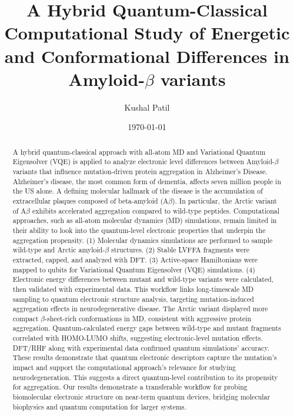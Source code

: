 \documentclass[%
 reprint,
 amsmath,amssymb,
 aps,
]{revtex4-2}
\begin{document}
\title{A Hybrid Quantum-Classical Computational
Study of Energetic and Conformational Differences in Amyloid-$\beta$ variants}

\author{Kushal Patil}

\date{\today}%

\begin{abstract}
A hybrid quantum-classical approach with all-atom MD and Variational Quantum Eigensolver (VQE) is applied to analyze electronic level differences between Amyloid-$\beta$ variants that influence mutation-driven protein aggregation in Alzheimer's Disease. Alzheimer’s disease, the most common form of dementia, affects seven million people in the US alone. A defining molecular hallmark of the disease is the accumulation of extracellular plaques composed of beta-amyloid (A$\beta$). In particular, the Arctic variant of A$\beta$ exhibits accelerated aggregation compared to wild-type peptides. Computational approaches, such as all-atom molecular dynamics (MD) simulations, remain limited in their ability to look into the quantum-level electronic properties that underpin the aggregation propensity. (1) Molecular dynamics simulations are performed to sample wild-type and Arctic amyloid-$\beta$ structures. (2) Stable LVFFA fragments were extracted, capped, and analyzed with DFT. (3) Active-space Hamiltonians were mapped to qubits for Variational Quantum Eigensolver (VQE) simulations. (4) Electronic energy differences between mutant and wild-type variants were calculated, then validated with experimental data. This workflow links long-timescale MD sampling to quantum electronic structure analysis, targeting mutation-induced aggregation effects in neurodegenerative disease.  The Arctic variant displayed more compact $\beta$-sheet-rich conformations in MD, consistent with aggressive protein aggregation. Quantum-calculated energy gaps between wild-type and mutant fragments correlated with HOMO-LUMO shifts, suggesting electronic-level mutation effects. DFT/RHF along with experimental data confirmed quantum simulations’ accuracy. These results demonstrate that quantum electronic descriptors capture the mutation’s impact and support the computational approach’s relevance for studying neurodegeneration. This suggests a direct quantum-level contribution to its propensity for aggregation. Our results demonstrate a transferable workflow for probing biomolecular electronic structure on near-term quantum devices, bridging molecular biophysics and quantum computation for larger systems.
\end{abstract}
\end{document}
